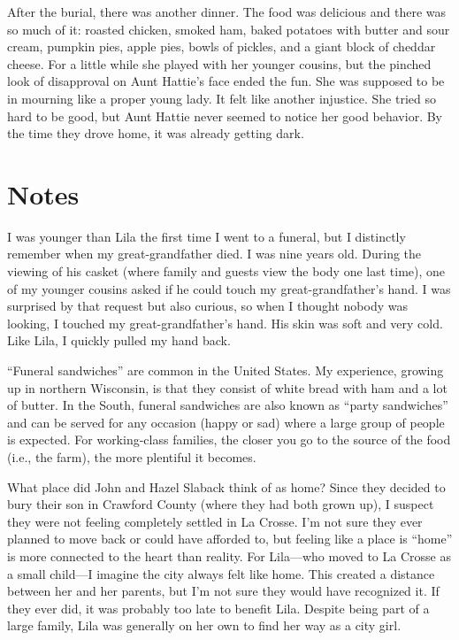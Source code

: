 \documentclass[
  american,
  letterpaper,
]{book}
\begin{document}
After the burial, there was another dinner. The food was delicious and
there was so much of it: roasted chicken, smoked ham, baked potatoes
with butter and sour cream, pumpkin pies, apple pies, bowls of pickles,
and a giant block of cheddar cheese. For a little while she played with
her younger cousins, but the pinched look of disapproval on Aunt
Hattie's face ended the fun. She was supposed to be in mourning like a
proper young lady. It felt like another injustice. She tried so hard to
be good, but Aunt Hattie never seemed to notice her good behavior. By
the time they drove home, it was already getting dark.

\section{Notes}\label{notes-14}

I was younger than Lila the first time I went to a funeral, but I
distinctly remember when my great-grandfather died. I was nine years
old. During the viewing of his casket (where family and guests view the
body one last time), one of my younger cousins asked if he could touch
my great-grandfather's hand. I was surprised by that request but also
curious, so when I thought nobody was looking, I touched my
great-grandfather's hand. His skin was soft and very cold. Like Lila, I
quickly pulled my hand back.

``Funeral sandwiches'' are common in the United States. My experience,
growing up in northern Wisconsin, is that they consist of white bread
with ham and a lot of butter. In the South, funeral sandwiches are also
known as ``party sandwiches'' and can be served for any occasion (happy
or sad) where a large group of people is expected. For working-class
families, the closer you go to the source of the food (i.e., the farm),
the more plentiful it becomes.

What place did John and Hazel Slaback think of as home? Since they
decided to bury their son in Crawford County (where they had both grown
up), I suspect they were not feeling completely settled in La Crosse.
I'm not sure they ever planned to move back or could have afforded to,
but feeling like a place is ``home'' is more connected to the heart than
reality. For Lila---who moved to La Crosse as a small child---I imagine
the city always felt like home. This created a distance between her and
her parents, but I'm not sure they would have recognized it. If they
ever did, it was probably too late to benefit Lila. Despite being part
of a large family, Lila was generally on her own to find her way as a
city girl.
\end{document}
